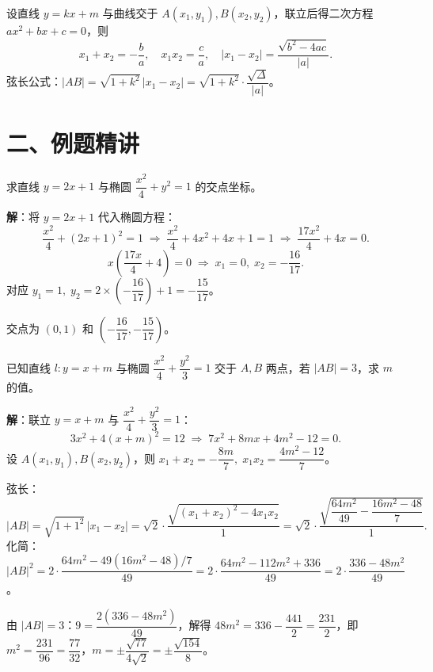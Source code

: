 \documentclass[12pt, a4paper]{ctexart}
\begin{document}
\begin{tipbox}[设而不求的核心公式]
设直线 $y=kx+m$ 与曲线交于 $A(x_1,y_1),B(x_2,y_2)$，联立后得二次方程 $ax^2+bx+c=0$，则
\[
  x_1+x_2=-\frac{b}{a},\quad x_1 x_2=\frac{c}{a},\quad |x_1-x_2|=\frac{\sqrt{b^2-4ac}}{|a|}.
\]
弦长公式：$|AB|=\sqrt{1+k^2}\,|x_1-x_2|=\sqrt{1+k^2}\cdot\dfrac{\sqrt{\Delta}}{|a|}$。
\end{tipbox}

\section*{\textcolor{examorange}{二、例题精讲}}

\begin{examplebox}[【例题1】联立方程求交点]
求直线 $y=2x+1$ 与椭圆 $\dfrac{x^2}{4}+y^2=1$ 的交点坐标。
\end{examplebox}

\noindent\textbf{解}：将 $y=2x+1$ 代入椭圆方程：
\[
  \frac{x^2}{4}+(2x+1)^2=1\;\Longrightarrow\;\frac{x^2}{4}+4x^2+4x+1=1\;\Longrightarrow\;\frac{17x^2}{4}+4x=0.
\]
\[
  x\!\left(\frac{17x}{4}+4\right)=0\;\Longrightarrow\;x_1=0,\;x_2=-\frac{16}{17}.
\]
对应 $y_1=1,\;y_2=2\times\!\left(-\dfrac{16}{17}\right)+1=-\dfrac{15}{17}$。

交点为 $(0,1)$ 和 $\left(-\dfrac{16}{17},-\dfrac{15}{17}\right)$。

\vspace{6pt}

\begin{examplebox}[【例题2】韦达定理与弦长]
已知直线 $l:y=x+m$ 与椭圆 $\dfrac{x^2}{4}+\dfrac{y^2}{3}=1$ 交于 $A,B$ 两点，若 $|AB|=3$，求 $m$ 的值。
\end{examplebox}

\noindent\textbf{解}：联立 $y=x+m$ 与 $\dfrac{x^2}{4}+\dfrac{y^2}{3}=1$：
\[
  3x^2+4(x+m)^2=12\;\Longrightarrow\;7x^2+8mx+4m^2-12=0.
\]
设 $A(x_1,y_1),B(x_2,y_2)$，则 $x_1+x_2=-\dfrac{8m}{7},\;x_1x_2=\dfrac{4m^2-12}{7}$。

弦长：
\[
  |AB|=\sqrt{1+1^2}\,|x_1-x_2|=\sqrt{2}\cdot\frac{\sqrt{(x_1+x_2)^2-4x_1x_2}}{1}=\sqrt{2}\cdot\frac{\sqrt{\dfrac{64m^2}{49}-\dfrac{16m^2-48}{7}}}{1}.
\]
化简：$|AB|^2=2\cdot\dfrac{64m^2-49(16m^2-48)/7}{49}=2\cdot\dfrac{64m^2-112m^2+336}{49}=2\cdot\dfrac{336-48m^2}{49}$。

由 $|AB|=3$：$9=\dfrac{2(336-48m^2)}{49}$，解得 $48m^2=336-\dfrac{441}{2}=\dfrac{231}{2}$，即 $m^2=\dfrac{231}{96}=\dfrac{77}{32}$，$m=\pm\dfrac{\sqrt{77}}{4\sqrt{2}}=\pm\dfrac{\sqrt{154}}{8}$。
\end{document}
